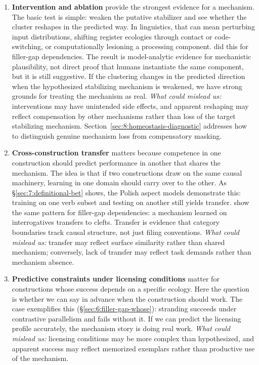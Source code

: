 \begin{enumerate}
\item \textbf{Intervention and ablation} provide the strongest evidence for a mechanism. The basic test is simple: weaken the putative stabilizer and see whether the cluster reshapes in the predicted way. In linguistics, that can mean perturbing input distributions, shifting register ecologies through contact or code-switching, or computationally lesioning a processing component. \textcite{boguraev2025} did this for filler-gap dependencies. The result is model-analytic evidence for mechanistic plausibility, not direct proof that humans instantiate the same component, but it is still suggestive. If the clustering changes in the predicted direction when the hypothesized stabilizing mechanism is weakened, we have strong grounds for treating the mechanism as real. \emph{What could mislead us:} interventions may have unintended side effects, and apparent reshaping may reflect compensation by other mechanisms rather than loss of the target stabilizing mechanism. Section~\ref{sec:8:homeostasis-diagnostic} addresses how to distinguish genuine mechanism loss from compensatory masking.

\item \textbf{Cross-construction transfer} matters because competence in one construction should predict performance in another that shares the mechanism. The idea is that if two constructions draw on the same causal machinery, learning in one domain should carry over to the other. As §\ref{sec:7:definitional-bet} shows, the Polish aspect models demonstrate this: training on one verb subset and testing on another still yields transfer. \textcite{boguraev2025} show the same pattern for filler-gap dependencies: a mechanism learned on interrogatives transfers to clefts. Transfer is evidence that category boundaries track causal structure, not just filing conventions. \emph{What could mislead us:} transfer may reflect surface similarity rather than shared mechanism; conversely, lack of transfer may reflect task demands rather than mechanism absence.

\item \textbf{Predictive constraints under licensing conditions} matter for constructions whose success depends on a specific ecology. Here the question is whether we can say in advance when the construction should work. The  case exemplifies this (§\ref{sec:6:filler-gap-whose}): stranding succeeds under contrastive parallelism and fails without it. If we can predict the licensing profile accurately, the mechanism story is doing real work. \emph{What could mislead us:} licensing conditions may be more complex than hypothesized, and apparent success may reflect memorized exemplars rather than productive use of the mechanism.


\end{enumerate}
